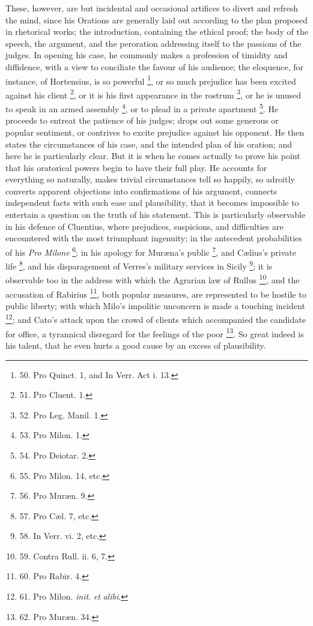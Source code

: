 These, however, are but
incidental and occasional artifices to divert and refresh the mind,
since his Orations are generally laid out according to the plan
proposed in rhetorical works; the introduction, containing the ethical
proof; the body of the speech, the argument, and the peroration
addressing itself to the passions of the judges. In opening his case,
he commonly makes a profession of timidity and diffidence, with a view
to conciliate the favour of his audience; the eloquence, for instance,
of Hortensius, is so powerful \footnote{50. Pro Quinct. 1, and In Verr.
Act i. 13.}, or so much prejudice has been
excited against his client \footnote{51. Pro
Cluent. 1.}, or it is his first appearance in
the rostrum \footnote{52. Pro Leg.
Manil. 1.}, or he is unused to speak in an armed assembly
\footnote{53. Pro
Milon. 1.}, or to plead in a private apartment
\footnote{54. Pro
Deiotar. 2.}. He proceeds
to entreat the patience of his judges; drops out some generous or
popular sentiment, or contrives to excite prejudice against his
opponent. He then states the circumstances of his case, and the
intended plan of his oration; and here he is particularly clear. But
it is when he comes actually to prove his point that his
oratorical powers begin to have their full play. He accounts for
everything so naturally, makes trivial circumstances tell so happily,
so adroitly converts apparent objections into confirmations of his
argument, connects independent facts with such ease and plausibility,
that it becomes impossible to entertain a question on the truth of his
statement. This is particularly observable in his defence of Cluentius,
where prejudices, suspicions, and difficulties are encountered with
the most triumphant ingenuity; in the antecedent probabilities of his \emph{Pro
Milone} \footnote{55. Pro Milon. 14, etc.}; in his apology for Muræna's public
\footnote{56. Pro
Muræn. 9.},
and Cælius's private life \footnote{57. Pro Cæl. 7, etc.}, and his disparagement of
Verres's military services in Sicily \footnote{58. In Verr. vi. 2, etc.}; it is observable too
in the address with which the Agrarian law of Rullus \footnote{59. Contra Rull. ii. 6, 7.}, and
the accusation of Rabirius \footnote{60. Pro
Rabir. 4.}, both popular measures, are
represented to be hostile to public liberty; with which Milo's
impolitic unconcern is made a touching incident \footnote{61. Pro Milon. \emph{init}. \emph{et}
\emph{alibi}.}; and
Cato's attack upon the crowd of clients which accompanied the
candidate for office, a tyrannical disregard for the feelings of the
poor \footnote{62. Pro
Muræn. 34.}. So great indeed is his talent, that he even hurts a
good cause by an excess of plausibility.

